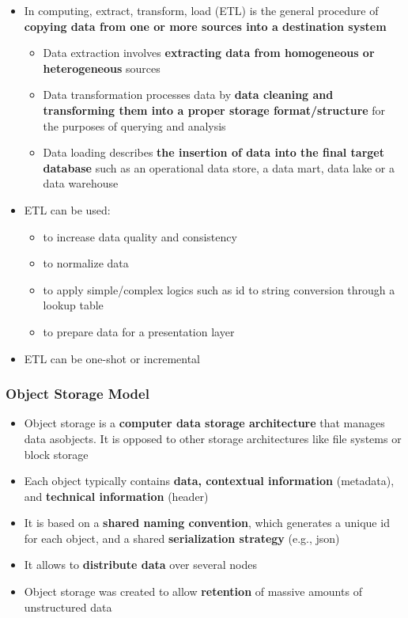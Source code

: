 \begin{itemize}
	\item In computing, extract, transform, load (ETL) is the general procedure of \textbf{copying data from one or more sources into a destination system}
	\begin{itemize}
		\item Data extraction involves \textbf{extracting data from homogeneous or heterogeneous} sources
		\item Data transformation processes data by \textbf{data cleaning and transforming them into a proper storage format/structure} for the purposes of querying and analysis
		\item Data loading describes \textbf{the insertion of data into the final target database} such as an operational data store, a data mart, data lake or a data warehouse
	\end{itemize}
	\item ETL can be used:
	\begin{itemize}
		\item to increase data quality and consistency
		\item to normalize data
		\item to apply simple/complex logics such as id to string conversion through a lookup table
		\item to prepare data for a presentation layer
	\end{itemize}
	\item ETL can be one-shot or incremental
\end{itemize}

\subsubsection{Object Storage Model}
\begin{itemize}
	\item Object storage is a \textbf{computer data storage architecture} that manages data asobjects. It is opposed to other storage architectures like file systems or block storage
	\item Each object typically contains \textbf{data, contextual information} (metadata), and \textbf{technical information} (header)
	\item It is based on a \textbf{shared naming convention}, which generates a unique id for each object, and a shared \textbf{serialization strategy} (e.g., json)
	\item It allows to \textbf{distribute data} over several nodes
	\item Object storage was created to allow \textbf{retention} of massive amounts of unstructured data
\end{itemize}

